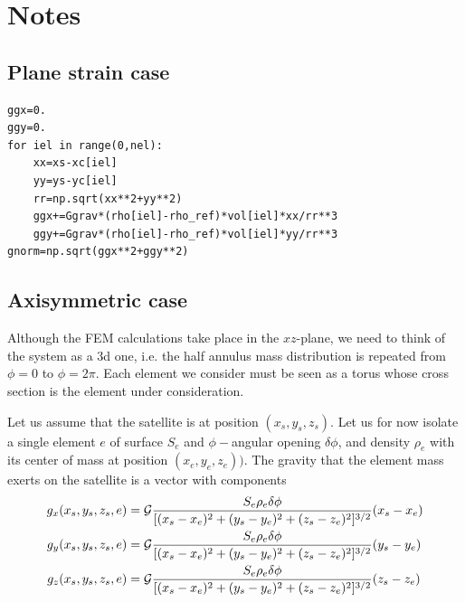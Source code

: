 \documentclass[a4paper,12pt]{article}
\begin{document}


\newpage
\section{Notes}
\subsection{Plane strain case}

\begin{lstlisting}
ggx=0.
ggy=0.
for iel in range(0,nel):
    xx=xs-xc[iel]
    yy=ys-yc[iel]
    rr=np.sqrt(xx**2+yy**2)
    ggx+=Ggrav*(rho[iel]-rho_ref)*vol[iel]*xx/rr**3
    ggy+=Ggrav*(rho[iel]-rho_ref)*vol[iel]*yy/rr**3
gnorm=np.sqrt(ggx**2+ggy**2)
\end{lstlisting}


\subsection{Axisymmetric case}

Although the FEM calculations take place in the $xz$-plane, we need to think 
of the system as a 3d one, i.e. the half annulus mass distribution is repeated
from $\phi=0$ to $\phi=2\pi$. Each element we consider must be seen as a torus 
whose cross section is the element under consideration.

Let us assume that the satellite is at position $(x_s,y_s,z_s)$.
Let us for now isolate a single element $e$ of surface $S_e$ and $\phi-$angular 
opening $\delta\phi$, and density $\rho_e$ with 
its center of mass at position $(x_e,y_e,z_e))$.
The gravity that the element mass exerts on the satellite is a vector with components
\begin{align}
g_x (x_s,y_s,z_s,e) &= {\cal G} \frac{S_e \rho_e \delta\phi}{[(x_s-x_e)^2+(y_s-y_e)^2+(z_s-z_e)^2]^{3/2}} (x_s-x_e)\\
g_y (x_s,y_s,z_s,e) &= {\cal G} \frac{S_e \rho_e \delta\phi}{[(x_s-x_e)^2+(y_s-y_e)^2+(z_s-z_e)^2]^{3/2}} (y_s-y_e)\\
g_z (x_s,y_s,z_s,e) &= {\cal G} \frac{S_e \rho_e \delta\phi}{[(x_s-x_e)^2+(y_s-y_e)^2+(z_s-z_e)^2]^{3/2}} (z_s-z_e)
\end{align}
\end{document}
